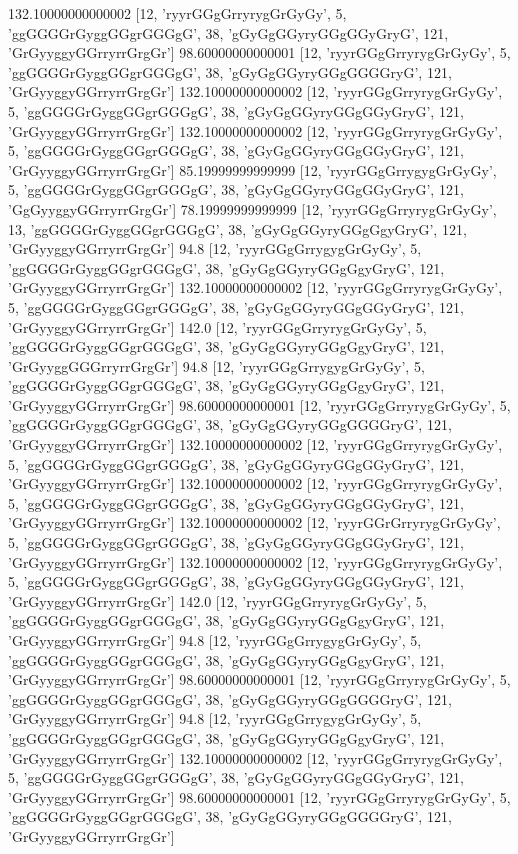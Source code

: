 132.10000000000002 [12, 'ryyrGGgGrryrygGrGyGy', 5, 'ggGGGGrGyggGGgrGGGgG', 38, 'gGyGgGGyryGGgGGyGryG', 121, 'GrGyyggyGGrryrrGrgGr']
98.60000000000001 [12, 'ryyrGGgGrryrygGrGyGy', 5, 'ggGGGGrGyggGGgrGGGgG', 38, 'gGyGgGGyryGGgGGGGryG', 121, 'GrGyyggyGGrryrrGrgGr']
132.10000000000002 [12, 'ryyrGGgGrryrygGrGyGy', 5, 'ggGGGGrGyggGGgrGGGgG', 38, 'gGyGgGGyryGGgGGyGryG', 121, 'GrGyyggyGGrryrrGrgGr']
132.10000000000002 [12, 'ryyrGGgGrryrygGrGyGy', 5, 'ggGGGGrGyggGGgrGGGgG', 38, 'gGyGgGGyryGGgGGyGryG', 121, 'GrGyyggyGGrryrrGrgGr']
85.19999999999999 [12, 'ryyrGGgGrrygygGrGyGy', 5, 'ggGGGGrGyggGGgrGGGgG', 38, 'gGyGgGGyryGGgGGyGryG', 121, 'GgGyyggyGGrryrrGrgGr']
78.19999999999999 [12, 'ryyrGGgGrryrygGrGyGy', 13, 'ggGGGGrGyggGGgrGGGgG', 38, 'gGyGgGGyryGGgGgyGryG', 121, 'GrGyyggyGGrryrrGrgGr']
94.8 [12, 'ryyrGGgGrrygygGrGyGy', 5, 'ggGGGGrGyggGGgrGGGgG', 38, 'gGyGgGGyryGGgGgyGryG', 121, 'GrGyyggyGGrryrrGrgGr']
132.10000000000002 [12, 'ryyrGGgGrryrygGrGyGy', 5, 'ggGGGGrGyggGGgrGGGgG', 38, 'gGyGgGGyryGGgGGyGryG', 121, 'GrGyyggyGGrryrrGrgGr']
142.0 [12, 'ryyrGGgGrryrygGrGyGy', 5, 'ggGGGGrGyggGGgrGGGgG', 38, 'gGyGgGGyryGGgGgyGryG', 121, 'GrGyyggGGGrryrrGrgGr']
94.8 [12, 'ryyrGGgGrrygygGrGyGy', 5, 'ggGGGGrGyggGGgrGGGgG', 38, 'gGyGgGGyryGGgGgyGryG', 121, 'GrGyyggyGGrryrrGrgGr']
98.60000000000001 [12, 'ryyrGGgGrryrygGrGyGy', 5, 'ggGGGGrGyggGGgrGGGgG', 38, 'gGyGgGGyryGGgGGGGryG', 121, 'GrGyyggyGGrryrrGrgGr']
132.10000000000002 [12, 'ryyrGGgGrryrygGrGyGy', 5, 'ggGGGGrGyggGGgrGGGgG', 38, 'gGyGgGGyryGGgGGyGryG', 121, 'GrGyyggyGGrryrrGrgGr']
132.10000000000002 [12, 'ryyrGGgGrryrygGrGyGy', 5, 'ggGGGGrGyggGGgrGGGgG', 38, 'gGyGgGGyryGGgGGyGryG', 121, 'GrGyyggyGGrryrrGrgGr']
132.10000000000002 [12, 'ryyrGGrGrryrygGrGyGy', 5, 'ggGGGGrGyggGGgrGGGgG', 38, 'gGyGgGGyryGGgGGyGryG', 121, 'GrGyyggyGGrryrrGrgGr']
132.10000000000002 [12, 'ryyrGGgGrryrygGrGyGy', 5, 'ggGGGGrGyggGGgrGGGgG', 38, 'gGyGgGGyryGGgGGyGryG', 121, 'GrGyyggyGGrryrrGrgGr']
142.0 [12, 'ryyrGGgGrryrygGrGyGy', 5, 'ggGGGGrGyggGGgrGGGgG', 38, 'gGyGgGGyryGGgGgyGryG', 121, 'GrGyyggyGGrryrrGrgGr']
94.8 [12, 'ryyrGGgGrrygygGrGyGy', 5, 'ggGGGGrGyggGGgrGGGgG', 38, 'gGyGgGGyryGGgGgyGryG', 121, 'GrGyyggyGGrryrrGrgGr']
98.60000000000001 [12, 'ryyrGGgGrryrygGrGyGy', 5, 'ggGGGGrGyggGGgrGGGgG', 38, 'gGyGgGGyryGGgGGGGryG', 121, 'GrGyyggyGGrryrrGrgGr']
94.8 [12, 'ryyrGGgGrrygygGrGyGy', 5, 'ggGGGGrGyggGGgrGGGgG', 38, 'gGyGgGGyryGGgGgyGryG', 121, 'GrGyyggyGGrryrrGrgGr']
132.10000000000002 [12, 'ryyrGGgGrryrygGrGyGy', 5, 'ggGGGGrGyggGGgrGGGgG', 38, 'gGyGgGGyryGGgGGyGryG', 121, 'GrGyyggyGGrryrrGrgGr']
98.60000000000001 [12, 'ryyrGGgGrryrygGrGyGy', 5, 'ggGGGGrGyggGGgrGGGgG', 38, 'gGyGgGGyryGGgGGGGryG', 121, 'GrGyyggyGGrryrrGrgGr']
